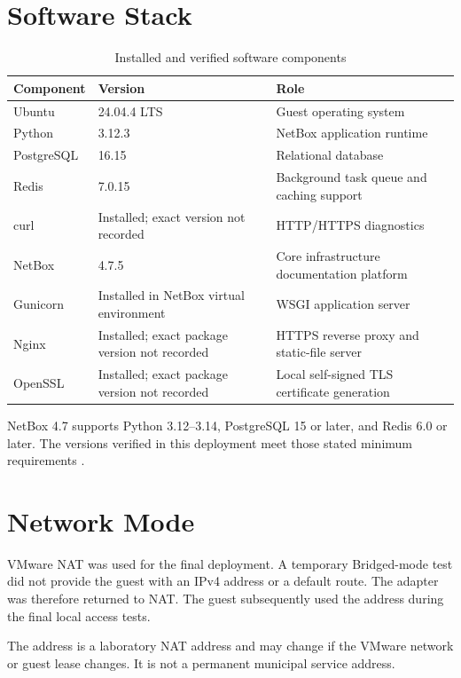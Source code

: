 \documentclass[11pt,a4paper,oneside]{report}
\newcommand{\pathcode}[1]{\path{#1}}
\begin{document}
\section{Software Stack}
\begin{table}[H]
\centering
\caption{Installed and verified software components}
\begin{tabularx}{\textwidth}{L{0.30\textwidth}L{0.24\textwidth}Y}
\toprule
\textbf{Component} & \textbf{Version} & \textbf{Role}\\
\midrule
Ubuntu & 24.04.4 LTS & Guest operating system\\
Python & 3.12.3 & NetBox application runtime\\
PostgreSQL & 16.15 & Relational database\\
Redis & 7.0.15 & Background task queue and caching support\\
curl & Installed; exact version not recorded & HTTP/HTTPS diagnostics\\
NetBox & 4.7.5 & Core infrastructure documentation platform\\
Gunicorn & Installed in NetBox virtual environment & WSGI application server\\
Nginx & Installed; exact package version not recorded & HTTPS reverse proxy and static-file server\\
OpenSSL & Installed; exact package version not recorded & Local self-signed TLS certificate generation\\
\bottomrule
\end{tabularx}
\end{table}

NetBox 4.7 supports Python 3.12--3.14, PostgreSQL 15 or later, and Redis 6.0 or later. The versions verified in this deployment meet those stated minimum requirements \cite{netbox-install,upgrade}.

\section{Network Mode}
VMware NAT was used for the final deployment. A temporary Bridged-mode test did not provide the guest with an IPv4 address or a default route. The adapter was therefore returned to NAT. The guest subsequently used the address \pathcode{192.168.227.131} during the final local access tests.

The address is a laboratory NAT address and may change if the VMware network or guest lease changes. It is not a permanent municipal service address.
\end{document}
